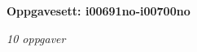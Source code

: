 \centerline{\bf Oppgavesett: i00691no-i00700no}
\vskip 10pt
\centerline{\it 10 oppgaver}\vskip 10pt
\vskip 10pt
